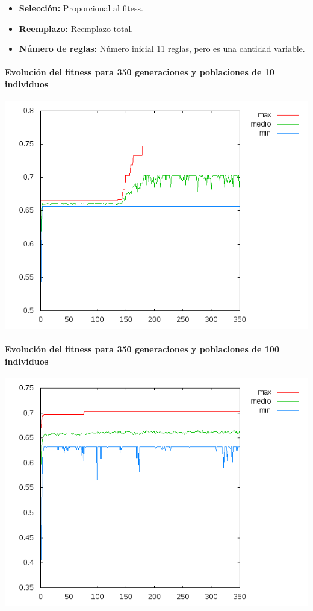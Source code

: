 \documentclass[nochap]{apuntes}
\begin{document}
\begin{itemize}
	\item \textbf{Selección:} Proporcional al fitess.
	\item \textbf{Reemplazo:} Reemplazo total.
	\item \textbf{Número de reglas:} Número inicial 11 reglas, pero es una cantidad variable.
\end{itemize}


\paragraph{Evolución del fitness para 350 generaciones y poblaciones de 10 individuos}
\begin{center}
\includegraphics[scale=0.6]{tex/img/g350_p10_ReemplazoTotal_SeleccionProporcionalAlFitness_reg11.png}
\end{center}
\paragraph{Evolución del fitness para 350 generaciones y poblaciones de 100 individuos}
\begin{center}
\includegraphics[scale=0.6]{tex/img/g350_p100_ReemplazoTotal_SeleccionProporcionalAlFitness_reg11.png}
\end{center}
\end{document}
